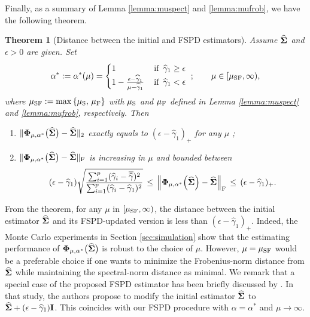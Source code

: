 \documentclass[times,sort&compress,3p]{elsarticle}
\newcommand{\BNUM}{\begin{enumerate}}
\newcommand{\ENUM}{\end{enumerate}}
\newcommand{\NN}{\nonumber}
\newtheorem{theorem}{Theorem}
\begin{document}
Finally, as a summary of Lemma \ref{lemma:muspect} and \ref{lemma:mufrob}, we have the following theorem.

\begin{theorem}[Distance between the initial and FSPD estimators]\label{thm:FSPDsumm}
Assume $\widehat{\bf \Sigma}$ and $\epsilon > 0$ are given. Set
\begin{equation}\NN
\alpha^* := \alpha^*(\mu) =
\begin{cases} 1  & \,\mbox{if }\, \widehat{\gamma}_{1} \geq \epsilon \\
	1 - \frac{\epsilon - \widehat{\gamma}_{1}}{\mu - \widehat{\gamma}_{1}} & \,\mbox{if }\,
	\widehat{\gamma}_{1} < \epsilon \end{cases} ~; \qquad
	\mu \in [\mu_{\rm SF}, \infty),
\end{equation}
where $\mu_{\rm SF} := \max \left\{ \mu_{\rm S}, \, \mu_{\rm F} \right\}$ with $\mu_{\rm S}$ and $\mu_{\rm F}$ defined in Lemma \ref{lemma:muspect} and \ref{lemma:mufrob}, respectively. Then
\BNUM
\item $\| {\bf \Phi}_{\mu, \alpha^*}\big(\widehat{\bf \Sigma}\big)
	- \widehat{\bf \Sigma} \|_2$ exactly equals to
	$(\epsilon - \widehat{\gamma}_{1})_+$
	for any $\mu$ ;
\item $\| {\bf \Phi}_{\mu, \alpha^*}\big(\widehat{\bf \Sigma}\big)
	- \widehat{\bf \Sigma} \|_{\rm F}$ is increasing
	 in $\mu$ and bounded between
\[
(\epsilon - \widehat{\gamma}_{1}) 
 \sqrt{\frac{\sum_{i=1}^p ({\widehat{\gamma}}_i - {\overline{\widehat{\gamma}}})^2}{\sum_{i=1}^p ({\widehat{\gamma}}_i - {\widehat{\gamma}}_1)^2} } 
\,\leq\,
\left\| {\bf \Phi}_{\mu, \alpha^*}\Big(\widehat{\bf \Sigma}\Big) 
	- \widehat{\bf \Sigma} \right\|_{\rm F}
\,\leq\, (\epsilon - \widehat{\gamma}_{1})_+.
\]
\ENUM
\end{theorem}
From the theorem, for any $\mu$ in $\left[ \mu_{\rm SF}, \infty \right)$,
the distance between the initial estimator $\widehat{\bf \Sigma}$ and its FSPD-updated version
is less than $(\epsilon - \widehat{\gamma}_{1})_+$.
Indeed, the Monte Carlo experiments in Section \ref{sec:simulation} show that the estimating performance of
${\bf \Phi}_{\mu, \alpha^*}\big(\widehat{\bf \Sigma}\big)$ is robust to
the choice of $\mu$. However, $\mu = \mu_{\rm SF}$ would be a preferable choice
if one wants to minimize the Frobenius-norm distance from $\widehat{\bf \Sigma}$ while maintaining the
spectral-norm distance as minimal.
We remark that a special case of the proposed FSPD estimator has been briefly discussed
by  \citet[Section 5.2]{Cai2016a}.
In that study, the authors
propose to modify the initial estimator $\widehat{\bf \Sigma}$ to
$\widehat{\bf \Sigma} + (\epsilon - \widehat{\gamma}_{1}) {\bf I}$. This coincides with
our FSPD procedure with $\alpha = \alpha^*$ and $\mu \rightarrow \infty$.
\end{document}

